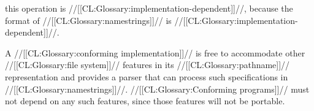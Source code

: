 this operation is //[[CL:Glossary:implementation-dependent]]//,
because the format of //[[CL:Glossary:namestrings]]// is //[[CL:Glossary:implementation-dependent]]//.


A //[[CL:Glossary:conforming implementation]]// is free to accommodate other //[[CL:Glossary:file system]]//
features in its //[[CL:Glossary:pathname]]// representation and provides a parser that can process 
such specifications in //[[CL:Glossary:namestrings]]//.  
//[[CL:Glossary:Conforming programs]]// must not depend on any such features, 
since those features will not be portable.

\endSubsection%
